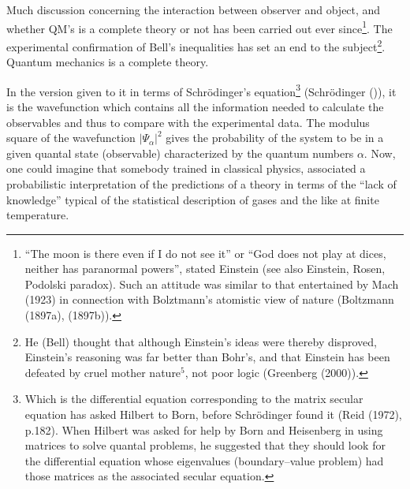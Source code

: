 \documentclass[a4paper,onecolumn,superscriptaddress,12pt,nofootinbib,twoside,raggedfooter,notitlepage]{revtex4-1}
\begin{document}
Much discussion concerning the interaction between observer and object, and whether QM's is a complete theory or not has been carried out ever since\footnote{``The moon is there even if I do not see it'' or ``God does not play at dices, neither has paranormal powers'', stated Einstein (see also Einstein, Rosen, Podolski paradox). Such an attitude was similar to that entertained by Mach (1923) in connection with Bolztmann's atomistic view of nature (Boltzmann (1897a), (1897b)).}. The experimental confirmation of Bell's inequalities has set an end to the subject\footnote{He (Bell) thought that although Einstein's ideas were thereby disproved, Einstein's reasoning was far better than Bohr's, and that Einstein has been defeated by cruel mother nature${}^5$, not poor logic (Greenberg (2000)).}. Quantum mechanics is a complete theory.


In the version given to it in terms of Schr\"odinger's equation\footnote{Which is the differential equation corresponding to the matrix secular equation has asked Hilbert to Born, before Schr\"odinger found it (Reid (1972), p.182). When Hilbert was asked for help by Born and Heisenberg in using matrices to solve quantal problems, he suggested that they should look for the differential equation whose eigenvalues (boundary--value problem) had those matrices as the associated secular equation.} (Schr\"odinger (\quad)), it is the wavefunction which contains all the information needed to calculate the observables and thus to compare with the experimental data. The modulus square of the wavefunction $|\Psi_\alpha|^2$ gives the probability of the system to be in a given quantal state (observable) characterized by the quantum numbers $\alpha$. Now, one could imagine that somebody trained in classical physics, associated a probabilistic interpretation of the predictions of a theory in terms of the ``lack of knowledge'' typical of the statistical description of gases and the like at finite temperature.
\end{document}
